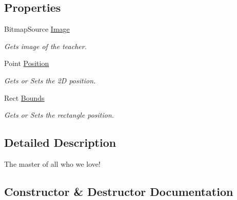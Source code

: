 \subsection*{Properties}
\begin{DoxyCompactItemize}
\item 
Bitmap\+Source \mbox{\hyperlink{class_o_e_invaders_1_1_library_1_1_sergyan_a8670ad6c669129b360fe491b07dd6254}{Image}}
\begin{DoxyCompactList}\small\item\em Gets image of the teacher. \end{DoxyCompactList}\item 
Point \mbox{\hyperlink{class_o_e_invaders_1_1_library_1_1_sergyan_a9aee5de320b735f88062789be7dddef0}{Position}}
\begin{DoxyCompactList}\small\item\em Gets or Sets the 2D position. \end{DoxyCompactList}\item 
Rect \mbox{\hyperlink{class_o_e_invaders_1_1_library_1_1_sergyan_a05ff3357b576c33e1756ada583d4898e}{Bounds}}
\begin{DoxyCompactList}\small\item\em Gets or Sets the rectangle position. \end{DoxyCompactList}\end{DoxyCompactItemize}


\subsection{Detailed Description}
The master of all who we love! 



\subsection{Constructor \& Destructor Documentation}
\mbox{\label{class_o_e_invaders_1_1_library_1_1_sergyan_a2dd55329c3f5ff407372ee7cdcf6f761}} 
